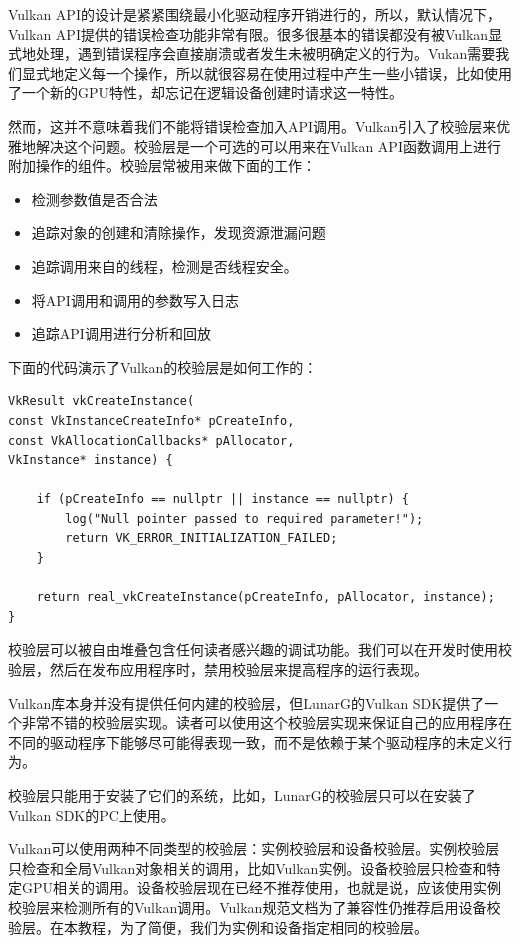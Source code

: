 \documentclass{ctexart}
\begin{document}
Vulkan API的设计是紧紧围绕最小化驱动程序开销进行的，所以，默认情况下，Vulkan API提供的错误检查功能非常有限。很多很基本的错误都没有被Vulkan显式地处理，遇到错误程序会直接崩溃或者发生未被明确定义的行为。Vukan需要我们显式地定义每一个操作，所以就很容易在使用过程中产生一些小错误，比如使用了一个新的GPU特性，却忘记在逻辑设备创建时请求这一特性。

然而，这并不意味着我们不能将错误检查加入API调用。Vulkan引入了校验层来优雅地解决这个问题。校验层是一个可选的可以用来在Vulkan API函数调用上进行附加操作的组件。校验层常被用来做下面的工作：

\begin{itemize}
	\item 检测参数值是否合法
	\item 追踪对象的创建和清除操作，发现资源泄漏问题
	\item 追踪调用来自的线程，检测是否线程安全。
	\item 将API调用和调用的参数写入日志
	\item 追踪API调用进行分析和回放
\end{itemize}

下面的代码演示了Vulkan的校验层是如何工作的：

\begin{lstlisting}[language={[ANSI]C}]
VkResult vkCreateInstance(
const VkInstanceCreateInfo* pCreateInfo,
const VkAllocationCallbacks* pAllocator,
VkInstance* instance) {

	if (pCreateInfo == nullptr || instance == nullptr) {
		log("Null pointer passed to required parameter!");
		return VK_ERROR_INITIALIZATION_FAILED;
	}

	return real_vkCreateInstance(pCreateInfo, pAllocator, instance);
}
\end{lstlisting}

校验层可以被自由堆叠包含任何读者感兴趣的调试功能。我们可以在开发时使用校验层，然后在发布应用程序时，禁用校验层来提高程序的运行表现。

Vulkan库本身并没有提供任何内建的校验层，但LunarG的Vulkan SDK提供了一个非常不错的校验层实现。读者可以使用这个校验层实现来保证自己的应用程序在不同的驱动程序下能够尽可能得表现一致，而不是依赖于某个驱动程序的未定义行为。

校验层只能用于安装了它们的系统，比如，LunarG的校验层只可以在安装了Vulkan SDK的PC上使用。

Vulkan可以使用两种不同类型的校验层：实例校验层和设备校验层。实例校验层只检查和全局Vulkan对象相关的调用，比如Vulkan实例。设备校验层只检查和特定GPU相关的调用。设备校验层现在已经不推荐使用，也就是说，应该使用实例校验层来检测所有的Vulkan调用。Vulkan规范文档为了兼容性仍推荐启用设备校验层。在本教程，为了简便，我们为实例和设备指定相同的校验层。
\end{document}
